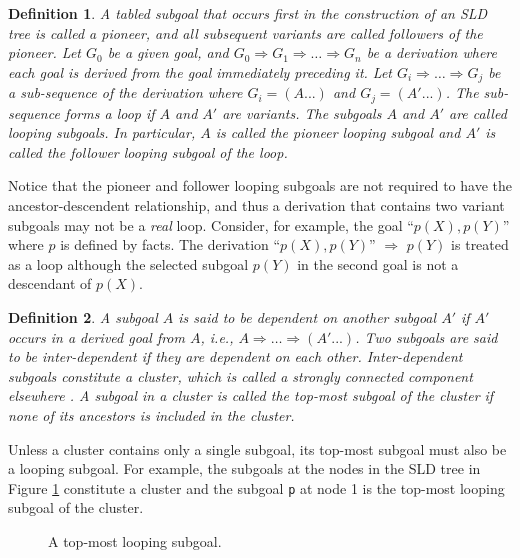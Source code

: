 \documentclass{tlp}
\newtheorem{definition}{Definition} \newtheorem{example}{Example} \newcommand{\pivot}[1]{\mathbin{\, {#1} \,}}
\begin{document}
\begin{definition} A tabled subgoal that occurs first in the construction of an SLD tree is called a {\it pioneer}, and all subsequent variants are called {\it followers} of the pioneer. Let $G_0$ be a given goal, and $G_0\Rightarrow G_1\Rightarrow\ldots\Rightarrow G_n$ be a {\it derivation} where each goal is derived from the goal immediately preceding it. Let $G_i\Rightarrow \ldots\Rightarrow G_j$ be a sub-sequence of the derivation where $G_i=(A...)$ and $G_j=(A'...)$. The sub-sequence forms a {\it loop} if $A$ and $A'$ are variants. The subgoals $A$ and $A'$ are called {\it looping subgoals}. In particular, $A$ is called the {\it pioneer looping subgoal} and $A'$ is called the {\it follower looping subgoal} of the loop.
\end{definition}

Notice that the pioneer and follower looping subgoals are not required to have the ancestor-descendent relationship, and thus a derivation that contains two variant subgoals may not be a {\it real} loop. Consider, for example, the goal ``$p(X),p(Y)$'' where $p$ is defined by facts. The derivation ``$p(X),p(Y)$'' $\Rightarrow$ $p(Y)$ is treated as a loop although the selected subgoal $p(Y)$ in the second goal is not a descendant of $p(X)$.

\begin{definition}  A subgoal $A$ is said to be {\it dependent} on another subgoal $A'$ if $A'$ occurs in a derived goal from $A$, i.e., $A\Rightarrow\ldots\Rightarrow(A'...)$. Two subgoals are said to be {\it inter-dependent} if they are dependent on each other. Inter-dependent subgoals constitute a {\it cluster}, which is called a {\it strongly connected component} elsewhere \cite{Sagonas98}. A subgoal in a cluster is called the {\it top-most} subgoal of the cluster if none of its ancestors is included in the cluster.
\end{definition}

Unless a cluster contains only a single subgoal, its top-most subgoal must also be a looping subgoal. For example, the subgoals at the nodes in the SLD tree in Figure \ref{fig:loops} constitute a cluster and the subgoal {\tt p} at node 1 is the top-most looping subgoal of the cluster.

\begin{center}
\begin{figure}
\epsfxsize=4cm 
\caption{\label{fig:loops}A top-most looping subgoal.}
\end{figure}
\end{center}
\end{document}
